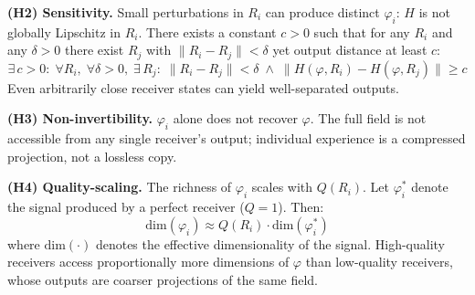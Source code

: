 \documentclass[12pt]{article}
\begin{document}
\textbf{(H2) Sensitivity.} Small perturbations in $R_i$ can produce distinct $\varphi_i$: $H$ is not globally Lipschitz in $R_i$. There exists a constant $c > 0$ such that for any $R_i$ and any $\delta > 0$ there exist $R_j$ with $\|R_i - R_j\| < \delta$ yet output distance at least $c$:
\begin{equation}
    \exists\, c > 0:\;\forall R_i,\;\forall \delta > 0,\;
    \exists\, R_j:\;
    \|R_i - R_j\| < \delta \;\wedge\;
    \|H(\varphi, R_i) - H(\varphi, R_j)\| \geq c
\end{equation}
Even arbitrarily close receiver states can yield well-separated outputs.

\textbf{(H3) Non-invertibility.} $\varphi_i$ alone does not recover $\varphi$. The full field is not accessible from any single receiver's output; individual experience is a compressed projection, not a lossless copy.

\textbf{(H4) Quality-scaling.} The richness of $\varphi_i$ scales with $Q(R_i)$. Let $\varphi_i^*$ denote the signal produced by a perfect receiver ($Q = 1$). Then:
\begin{equation}
    \mathrm{dim}(\varphi_i) \approx Q(R_i) \cdot \mathrm{dim}(\varphi_i^*)
\end{equation}
where $\mathrm{dim}(\cdot)$ denotes the effective dimensionality of the signal. High-quality receivers access proportionally more dimensions of $\varphi$ than low-quality receivers, whose outputs are coarser projections of the same field.
\end{document}
